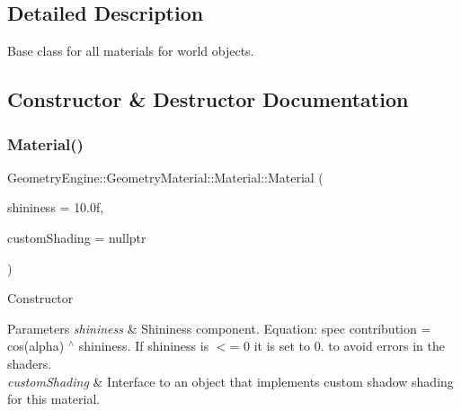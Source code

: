 \subsection{Detailed Description}
Base class for all materials for world objects. 

\subsection{Constructor \& Destructor Documentation}
\mbox{\label{class_geometry_engine_1_1_geometry_material_1_1_material_a9d60d29295dd7dd26158dce1a90cf838}} 
\subsubsection{\texorpdfstring{Material()}{Material()}\hspace{0.1cm}{\footnotesize\ttfamily [1/2]}}
{\footnotesize\ttfamily Geometry\+Engine\+::\+Geometry\+Material\+::\+Material\+::\+Material (\begin{DoxyParamCaption}\item[{float}]{shininess = {\ttfamily 10.0f},  }\item[{const \mbox{\hyperlink{class_geometry_engine_1_1_custom_shading_1_1_custom_shading_interface}{Custom\+Shading\+::\+Custom\+Shading\+Interface}} $\ast$const}]{custom\+Shading = {\ttfamily nullptr} }\end{DoxyParamCaption})}

Constructor 
\begin{DoxyParams}{Parameters}
{\em shininess} & Shininess component. Equation\+: spec contribution = cos(alpha) $^\wedge$ shininess. If shininess is $<$= 0 it is set to 0. to avoid errors in the shaders. \\
\hline
{\em custom\+Shading} & Interface to an object that implements custom shadow shading for this material. \\
\hline
\end{DoxyParams}
\mbox{\label{class_geometry_engine_1_1_geometry_material_1_1_material_a18c3bbd40d6c410c9c8ca9dfc36f15ee}} 
